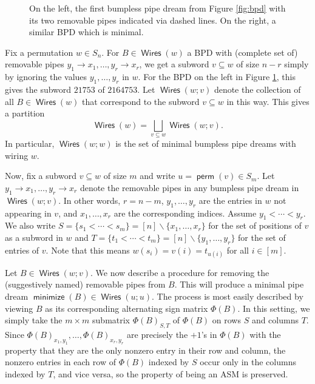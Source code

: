 \documentclass[11pt]{article}
\makeatletter
\theoremstyle{definition}
\numberwithin{equation}{section}
\newcommand{\sseq}{\subseteq}
\newcommand{\sm}{\smallsetminus}
\DeclareMathOperator{\perm}{\mathsf{perm}}
\DeclareMathOperator{\minimize}{\mathsf{minimize}}
\DeclareMathOperator{\Wires}{\mathsf{Wires}}
\newcommand{\pipecolor}{UForange}
\newcommand{\drawHorizontal}[2]{
    \draw[color=\pipecolor,very thick]
    (#1-0.5,#2) to (#1+0.5,#2);
}
\newcommand{\drawVertical}[2]{
    \draw[color=\pipecolor,very thick]
    (#1,#2-0.5) to (#1,#2+0.5);
}
\newcommand{\drawCross}[2]{
    \drawHorizontal{#1}{#2}
    \drawVertical{#1}{#2}
}
\newcommand{\drawRelbow}[2]{
    \draw[color=\pipecolor,very thick]
    (#1,#2-0.5) to (#1,#2-0.25) to[bend left] (#1+0.25,#2) to (#1+0.5,#2);
}
\newcommand{\drawJelbow}[2]{
    \draw[color=\pipecolor,very thick]
    (#1,#2+0.5) to (#1,#2+0.25) to[bend left] (#1-0.25,#2) to (#1-0.5,#2);
}
\newcommand{\drawBump}[2]{
    \drawRelbow{#1}{#2}
    \drawJelbow{#1}{#2}
}
\newcommand{\drawBPDTile}[3]{
    \ifnum #3=1 \drawVertical{#1}{#2}   \fi
    \ifnum #3=2 \drawHorizontal{#1}{#2} \fi
    \ifnum #3=3 \drawCross{#1}{#2}      \fi
    \ifnum #3=4 \drawRelbow{#1}{#2}     \fi
    \ifnum #3=5 \drawJelbow{#1}{#2}     \fi
    \ifnum #3=6 \drawBump{#1}{#2}       \fi
}
\newcommand{\drawBPD}[4]
{
    \draw[
        step=1.0,xshift=-0.5cm,yshift=0.5cm,
        black,opacity=0.5,thin
    ] (#1,#2) grid (#1+#3,#2-#3);
    
    \BPD@i = 0
    \BPD@j = 0
    \foreach \t in {#4}{
        \drawBPDTile{#1+\number\BPD@j}{#2-\number\BPD@i}{\t}
        \ifnum\BPD@j < \numexpr#3-1\relax
            \global\advance\BPD@j by 1
        \else
            \global\BPD@j = 0
            \global\advance\BPD@i by 1
        \fi
    }
}
\newcommand{\drawLabels}[4]
{
    \foreach \i\w in {#4}{
        \node at (#1+\i-1,#2-#3) {\i};
        \node at (#1+#3,#2+1-\i) {\w};
    }
}
\newcommand{\drawRemPipes}[4]
{
    \foreach \i\j in {#4}{
        \draw[\pipecolor,very thick,dashed]
        (#1+\j-1,#2-#3+0.5) to (#1+\j-1,#2-\i+0.75) to[bend left] (#1+\j-0.75,#2-\i+1) to (#1+#3-0.5,#2-\i+1);
    }
}
\newcommand{\drawBPDwithL}[5]
{
    \drawBPD{#1}{#2}{#3}{#4}
    \drawLabels{#1}{#2}{#3}{#5}
}
\newcommand{\drawBPDwithRPL}[6]{
    \drawBPD{#1}{#2}{#3}{#4}
    \drawRemPipes{#1}{#2}{#3}{#5}
    \drawLabels{#1}{#2}{#3}{#6}
}
\makeatother
\begin{document}
\begin{figure}
    \centering
    \caption{On the left, the first bumpless pipe dream from Figure \ref{fig:bpd} with its two removable pipes indicated via dashed lines.
    On the right, a similar BPD which is minimal.}
    \label{fig:min_bpd}
\end{figure}

Fix a permutation $w\in S_n$.
For $B\in \Wires(w)$ a BPD with (complete set of) removable pipes $y_1\to x_1,\dots,y_r\to x_r$, we get a subword $v\sseq w$ of size $n-r$ simply by ignoring the values $y_1,\dots,y_r$ in $w$.
For the BPD on the left in Figure \ref{fig:min_bpd}, this gives the subword $21753$ of $2164753$.
Let $\Wires(w;v)$ denote the collection of all $B\in \Wires(w)$ that correspond to the subword $v\sseq w$ in this way.
This gives a partition \[
    \Wires(w) = \bigsqcup_{v\sseq w} \Wires(w;v).
\]
In particular, $\Wires(w;w)$ is the set of minimal bumpless pipe dreams with wiring $w$.

Now, fix a subword $v\sseq w$ of size $m$ and write $u = \perm(v) \in S_m$.
Let $y_1\to x_1,\dots,y_r\to x_r$ denote the removable pipes in any bumpless pipe dream in $\Wires(w;v)$.
In other words, $r = n-m$, $y_1,\dots,y_r$ are the entries in $w$ not appearing in $v$, and $x_1,\dots,x_r$ are the corresponding indices.
Assume $y_1< \cdots< y_r$.
We also write $S = \{s_1<\cdots<s_m\} = [n]\sm \{x_1,\dots,x_r\}$ for the set of positions of $v$ as a subword in $w$ and $T = \{t_1<\cdots<t_m\} = [n]\sm \{y_1,\dots,y_r\}$ for the set of entries of $v$.
Note that this means $w(s_i) = v(i) = t_{u(i)}$ for all $i\in[m]$.

Let $B\in \Wires(w;v)$.
We now describe a procedure for removing the (suggestively named) removable pipes from $B$.
This will produce a minimal pipe dream $\minimize(B)\in \Wires(u;u)$.
The process is most easily described by viewing $B$ as its corresponding alternating sign matrix $\Phi(B)$.
In this setting, we simply take the $m\times m$ submatrix $\Phi(B)_{S,T}$ of $\Phi(B)$ on rows $S$ and columns $T$.
Since $\Phi(B)_{x_1,y_1},\dots,\Phi(B)_{x_r,y_r}$ are precisely the $+1$'s in $\Phi(B)$ with the property that they are the only nonzero entry in their row and column, the nonzero entries in each row of $\Phi(B)$ indexed by $S$ occur only in the columns indexed by $T$, and vice versa, so the property of being an ASM is preserved.
\end{document}

